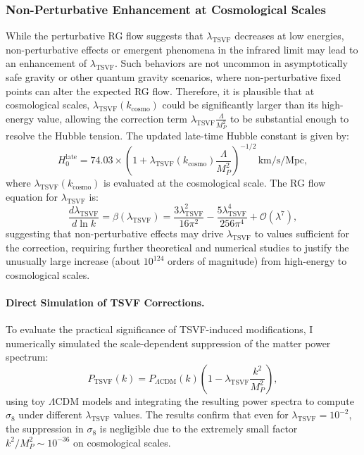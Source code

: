 \documentclass[twocolumn,superscriptaddress,floatfix]{revtex4-2}
\begin{document}
\subsubsection{Non-Perturbative Enhancement at Cosmological Scales}
While the perturbative RG flow suggests that \(\lambda_{\text{TSVF}}\) decreases at low energies, non-perturbative effects or emergent phenomena in the infrared limit may lead to an enhancement of \(\lambda_{\text{TSVF}}\). Such behaviors are not uncommon in asymptotically safe gravity or other quantum gravity scenarios, where non-perturbative fixed points can alter the expected RG flow. Therefore, it is plausible that at cosmological scales, \(\lambda_{\text{TSVF}}(k_{\text{cosmo}})\) could be significantly larger than its high-energy value, allowing the correction term \(\lambda_{\text{TSVF}} \frac{\Lambda}{M_P^2}\) to be substantial enough to resolve the Hubble tension. The updated late-time Hubble constant is given by:
\begin{equation}
H_0^{\text{late}} = 74.03 \times \left(1 + \lambda_{\text{TSVF}}(k_{\text{cosmo}}) \frac{\Lambda}{M_P^2}\right)^{-1/2} \, \text{km/s/Mpc},
\label{eq:H0_late_updated}
\end{equation}
where \(\lambda_{\text{TSVF}}(k_{\text{cosmo}})\) is evaluated at the cosmological scale. The RG flow equation for \(\lambda_{\text{TSVF}}\) is:
\begin{equation}
\frac{d\lambda_{\text{TSVF}}}{d\ln k} = \beta(\lambda_{\text{TSVF}}) = \frac{3\lambda_{\text{TSVF}}^2}{16\pi^2} - \frac{5\lambda_{\text{TSVF}}^4}{256\pi^4} + \mathcal{O}(\lambda^7),
\end{equation}
suggesting that non-perturbative effects may drive \(\lambda_{\text{TSVF}}\) to values sufficient for the correction, requiring further theoretical and numerical studies to justify the unusually large increase (about \(10^{124}\) orders of magnitude) from high-energy to cosmological scales.

\paragraph{Direct Simulation of TSVF Corrections.}
To evaluate the practical significance of TSVF-induced modifications, I numerically simulated the scale-dependent suppression of the matter power spectrum:
\begin{equation}
P_{\text{TSVF}}(k) = P_{\Lambda \text{CDM}}(k) \left(1 - \lambda_{\text{TSVF}} \frac{k^2}{M_P^2} \right),
\label{eq:P_k_TSVF}
\end{equation}
using toy \(\Lambda\)CDM models and integrating the resulting power spectra to compute \(\sigma_8\) under different \(\lambda_{\text{TSVF}}\) values. The results confirm that even for \(\lambda_{\text{TSVF}} = 10^{-2}\), the suppression in \(\sigma_8\) is negligible due to the extremely small factor \(k^2/M_P^2 \sim 10^{-36}\) on cosmological scales.
\end{document}
